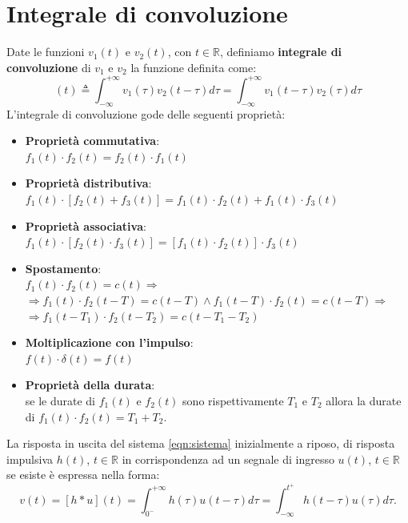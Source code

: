\documentclass[a4paper, titlepage, oneside]{scrbook}
\begin{document}
\section{Integrale di convoluzione}
Date le funzioni $v_1(t)$ e $v_2(t)$, con $t\in \mathbb{R}$, definiamo \textbf{integrale di convoluzione} di $v_1$ e $v_2$ la funzione definita come:
\begin{equation}
[v_1 * v_2](t) \triangleq \int_{-\infty}^{+\infty}v_1(\tau)v_2(t - \tau) d\tau = \int_{-\infty}^{+\infty}v_1(t - \tau)v_2(\tau) d\tau
\label{eqn:integrale_convoluzione}
\end{equation}
L'integrale di convoluzione gode delle seguenti proprietà:
\begin{itemize}
	\item \textbf{Proprietà commutativa}:\\
	$f_1(t)\cdot f_2(t) = f_2(t) \cdot  f_1(t)$
	\item \textbf{Proprietà distributiva}:\\
	$f_1(t)\cdot [f_2(t)+f_3(t)]=f_1(t)\cdot f_2(t)+f_1(t)\cdot f_3(t)$
	\item \textbf{Proprietà associativa}:\\
	$f_1(t)\cdot [f_2(t)\cdot f_3(t)]=[f_1(t)\cdot f_2(t)]\cdot f_3(t)$
	\item \textbf{Spostamento}:\\
	$f_1(t)\cdot f_2(t)=c(t) \Rightarrow$\\
	$\Rightarrow f_1(t)\cdot f_2(t-T)=c(t-T) \wedge f_1(t-T)\cdot f_2(t)=c(t-T) \Rightarrow$\\
	$\Rightarrow f_1(t-T_1)\cdot f_2(t-T_2)=c(t-T_1-T_2)$
	\item \textbf{Moltiplicazione con l'impulso}:\\
	$f(t)\cdot \delta(t)=f(t)$
	\item \textbf{Proprietà della durata}:\\
	se le durate di $f_1(t)$ e $f_2(t)$ sono rispettivamente $T_1$ e $T_2$
	allora la durate di $f_1(t)\cdot f_2(t)=T_1+T_2$.
\end{itemize}
La risposta in uscita del sistema \ref{eqn:sistema} inizialmente a riposo, di risposta impulsiva $h(t)$, $t\in\mathbb{R}$ in corrispondenza ad un segnale di ingresso
$u(t)$, $t\in\mathbb{R}$ se esiste è espressa nella forma:
\begin{equation*}
	v(t)=[h*u](t)=\int_{0^-}^{+\infty}h(\tau)u(t-\tau)d\tau=\int_{-\infty}^{t^+}h(t-\tau)u(\tau)d\tau.
\end{equation*}
\end{document}

